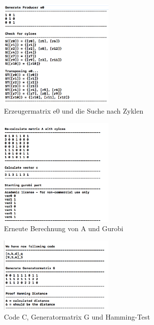 \begin{figure}
	\centering
	\includegraphics[width=0.5\textwidth]{Pictures/step4_cycle_check}
	\caption{Erzeugermatrix e0 und die Suche nach Zyklen}
\end{figure}

\begin{figure}
	\centering
	\includegraphics[width=0.5\textwidth]{Pictures/step4_recalcA}
	\caption{Erneute Berechnung von A und Gurobi}
\end{figure}

\begin{figure}
	\centering
	\includegraphics[width=0.5\textwidth]{Pictures/step4_end}
	\caption{Code C, Generatormatrix G und Hamming-Test}
\end{figure}
\newpage